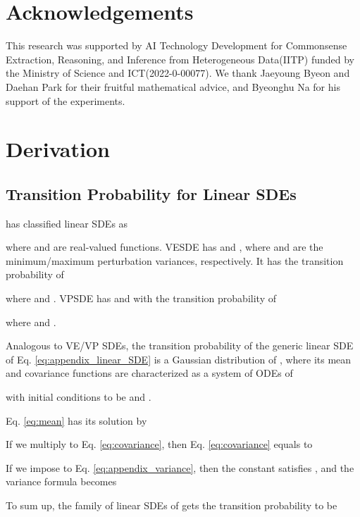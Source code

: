 \documentclass[nohyperref]{article}
\theoremstyle{plain}
\theoremstyle{definition}
\theoremstyle{remark}
\begin{document}
\section*{Acknowledgements}

This research was supported by AI Technology Development for Commonsense Extraction, Reasoning, and Inference from Heterogeneous Data(IITP) funded by the Ministry of Science and ICT(2022-0-00077). We thank Jaeyoung Byeon and Daehan Park for their fruitful mathematical advice, and Byeonghu Na for his support of the experiments.

\nocite{langley00}





\newpage
\appendix
\onecolumn

\section{Derivation}

\subsection{Transition Probability for Linear SDEs}\label{sec:transition_probability}

\citet{kim2022maximum} has classified linear SDEs as

where  and  are real-valued functions. VESDE has  and , where  and  are the minimum/maximum perturbation variances, respectively. It has the transition probability of

where  and . VPSDE has  and  with the transition probability of

where  and .

Analogous to VE/VP SDEs, the transition probability of the generic linear SDE of Eq. \eqref{eq:appendix_linear_SDE} is a Gaussian distribution of , where its mean and covariance functions are characterized as a system of ODEs of

with initial conditions to be  and .

Eq. \eqref{eq:mean} has its solution by

If we multiply  to Eq. \eqref{eq:covariance}, then Eq. \eqref{eq:covariance} equals to

If we impose  to Eq. \eqref{eq:appendix_variance}, then the constant  satisfies , and the variance formula becomes

To sum up, the family of linear SDEs of  gets the transition probability to be
\end{document}
